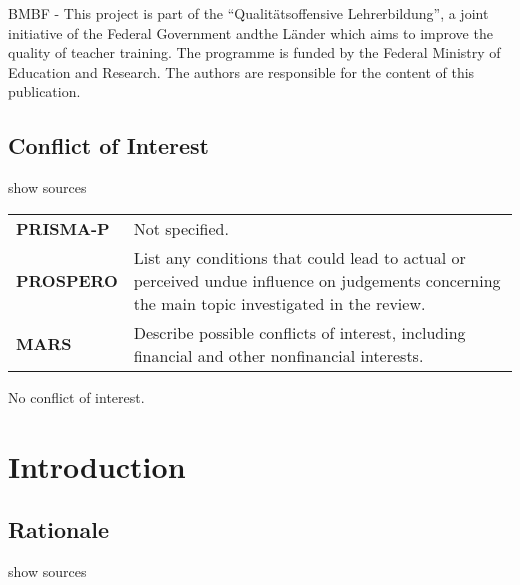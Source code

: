 \documentclass[
]{article}
\begin{document}
BMBF - This project is part of the ``Qualitätsoffensive Lehrerbildung'',
a joint initiative of the Federal Government andthe Länder which aims to
improve the quality of teacher training. The programme is funded by the
Federal Ministry of Education and Research. The authors are responsible
for the content of this publication.

\hypertarget{conflict-of-interest}{%
\subsection{Conflict of Interest}\label{conflict-of-interest}}

show sources

\hypertarget{coi}{}
\begin{collapse}

\begin{table}[H]
\centering
\begin{tabular}{>{}l|l}
\hline
\cellcolor[HTML]{ececec}{source} & \cellcolor[HTML]{ececec}{description}\\
\hline
\textbf{PRISMA-P} & Not specified.\\
\hline
\textbf{PROSPERO} & List any conditions that could lead to actual or perceived undue influence on judgements concerning the main topic investigated in the review.\\
\hline
\textbf{MARS} & Describe possible conflicts of interest, including financial and other nonfinancial interests.\\
\hline
\end{tabular}
\end{table}

\end{collapse}

No conflict of interest.

\hypertarget{introduction}{%
\section{Introduction}\label{introduction}}

\hypertarget{rationale}{%
\subsection{Rationale}\label{rationale}}

show sources
\end{document}
